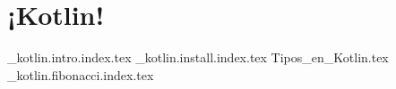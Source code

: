 \chapter{¡Kotlin!}
  \begin{refsection}
    {_kotlin.intro.index.tex}
    {_kotlin.install.index.tex}
    {Tipos_en_Kotlin.tex}
    {_kotlin.fibonacci.index.tex}
    \nocite{*}
    \printbibliography[keyword={kotlin}]
  \end{refsection}
  
